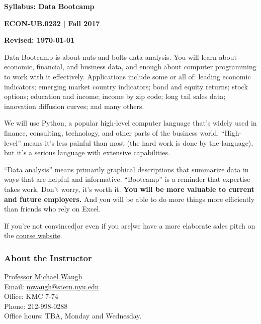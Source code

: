 



\pagestyle{headandfoot}
\runningheadrule
\firstpageheadrule
{}
\runningfooter{}{}{}


\centerline{\Large\bf Syllabus:  Data Bootcamp}
\vspace{3mm}
\centerline{\large\bf ECON-UB.0232 $|$ Fall 2017}
\vspace{3mm}
\centerline{\bf Revised:  \today}

\bigskip

Data Bootcamp is about nuts and bolts data analysis. You will learn about economic, financial, and business
data, and enough about computer programming to work with it effectively. Applications include some or all of: leading economic indicators; emerging market country indicators; bond and equity returns; stock options; education and income; income by zip code; long tail sales data; innovation diffusion curves; and many others.

We will use Python, a popular high-level computer language that's widely used in finance, consulting,
technology, and other parts of the business world. ``High-level'' means it's less painful than most (the hard work is done by the language), but it's a serious language with extensive capabilities.

``Data analysis'' means primarily graphical descriptions that summarize data
in ways that are helpful and informative. ``Bootcamp'' is a reminder that expertise takes work. Don't worry, it's worth it. {\bf You will be more valuable to current and future employers.\/} And you will be able to do more things more efficiently than friends who rely on Excel.

If you're not convinced|or even if you are|we have a more elaborate sales pitch on the
\href{https://nyu.data-bootcamp.com/}{course website}.

\subsubsection*{About the Instructor}
\href{http://www.waugheconomics.com}{Professor Michael Waugh} \\
Email: \href{mailto:mailto:mwaugh@stern.nyu.edu}{mwaugh@stern.nyu.edu}\\
Office: KMC 7-74\\
Phone: 212-998-0288\\
Office hours: TBA, Monday and Wednesday.

